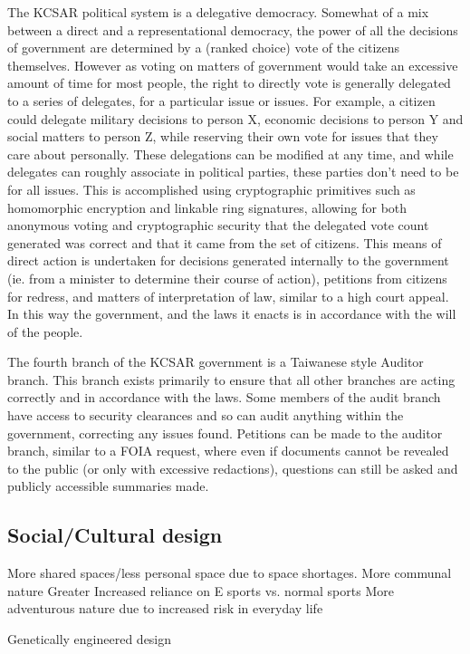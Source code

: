 \documentclass[10pt]{article}
\begin{document}
The KCSAR political system is a delegative democracy. Somewhat of a mix between a direct and a representational democracy, the power of all the decisions of government are determined by a (ranked choice) vote of the citizens themselves. However as voting on matters of government would take an excessive amount of time for most people, the right to directly vote is generally delegated to a series of delegates, for a particular issue or issues. For example, a citizen could delegate military decisions to person X, economic decisions to person Y and social matters to person Z, while reserving their own vote for issues that they care about personally. These delegations can be modified at any time, and while delegates can roughly associate in political parties, these parties don't need to be for all issues. This is accomplished using cryptographic primitives such as homomorphic encryption and linkable ring signatures, allowing for both anonymous voting and cryptographic security that the delegated vote count generated was correct and that it came from the set of citizens. This means of direct action is undertaken for decisions generated internally to the government (ie. from a minister to determine their course of action), petitions from citizens for redress, and matters of interpretation of law, similar to a high court appeal. In this way the government, and the laws it enacts is in accordance with the will of the people.

The fourth branch of the KCSAR government is a Taiwanese style Auditor branch. This branch exists primarily to ensure that all other branches are acting correctly and in accordance with the laws. Some members of the audit branch have access to security clearances and so can audit anything within the government, correcting any issues found. Petitions can be made to the auditor branch, similar to a FOIA request, where even if documents cannot be revealed to the public (or only with excessive redactions), questions can still be asked and publicly accessible summaries made. 


\subsection*{Social/Cultural design}
More shared spaces/less personal space due to space shortages.
More communal nature
Greater 
Increased reliance on E sports vs. normal sports
More adventurous nature due to increased risk in everyday life

Genetically engineered design
\end{document}
